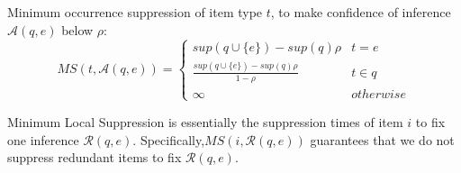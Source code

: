 \begin{definition}
Minimum occurrence suppression of item type $t$, to make confidence of
inference $\mathcal{A}(q,e)$ below $\rho$:
 \hspace{4mm}
\[MS(t,\mathcal{A}(q,e))=
\begin{cases}
sup(q\cup \{e\})-sup(q)\rho & t=e  \\
\frac{sup(q\cup \{e\})-sup(q)\rho}{1-\rho} & t\in q \\
 \infty & otherwise
\end{cases} \]
\end{definition}
Minimum Local Suppression is essentially the suppression times of item $i$ to fix one inference $\mathcal{R}(q,e)$.
Specifically,$ MS(i,\mathcal{R}(q,e))$ guarantees that we do not suppress redundant items to fix  $\mathcal{R}(q,e)$.










